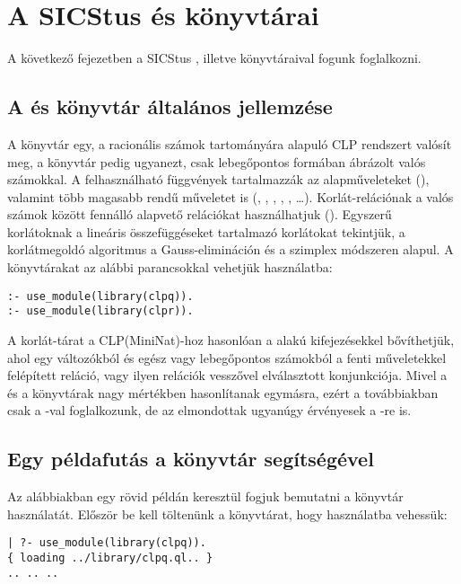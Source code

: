 \clearpage

\section{A SICStus \clpq és \clpr könyvtárai}

A következő fejezetben a SICStus \clpq, illetve \clpr könyvtáraival
fogunk foglalkozni.

\subsection{A \clpq és \clpr könyvtár általános jellemzése}

A \clpq könyvtár egy, a racionális számok tartományára
alapuló CLP rendszert valósít meg, a \clpr könyvtár pedig ugyanezt, csak
lebegőpontos formában ábrázolt valós számokkal. A felhasználható függvények
tartalmazzák az alapműveleteket (\cd{+ - * /}), valamint több magasabb rendű
műveletet is (, , , , , \ldots).
Korlát-relációnak a valós számok között fennálló alapvető relációkat
használhatjuk (\cd{= =:= < > =< >= =\bs=}). Egyszerű korlátoknak a lineáris
összefüggéseket tartalmazó korlátokat tekintjük, a korlátmegoldó algoritmus
a Gauss-elimináción és a szimplex módszeren alapul. A könyvtárakat az alábbi
parancsokkal vehetjük használatba:

\begin{verbatim}
:- use_module(library(clpq)).
:- use_module(library(clpr)).
\end{verbatim}

A korlát-tárat a CLP(MiniNat)-hoz hasonlóan a  alakú
kifejezésekkel bővíthetjük, ahol  egy változókból és egész vagy
lebegőpontos számokból a fenti műveletekkel felépített reláció, vagy
ilyen relációk vesszővel elválasztott konjunkciója.
\br
Mivel a \clpq és a \clpr könyvtárak nagy mértékben hasonlítanak
egymásra, ezért a továbbiakban csak a \Clpq-val foglalkozunk, de az
elmondottak ugyanúgy érvényesek a \Clpr-re is.

\subsection{Egy példafutás a \clpq könyvtár segítségével}

Az alábbiakban egy rövid példán keresztül fogjuk bemutatni a \clpq
könyvtár használatát.
\br
Először be kell töltenünk a \clpq könyvtárat, hogy használatba vehessük:

\begin{verbatim}
| ?- use_module(library(clpq)).
{ loading ../library/clpq.ql.. }
.. .. ..
\end{verbatim}

